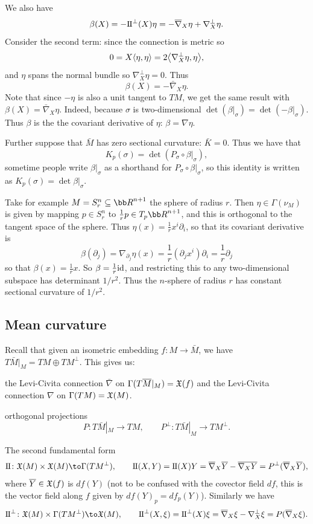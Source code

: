 We also have
$$ \beta(X) = -{\rm I\mkern-1mu\relax I}^\perp(X)\eta = -\overline\nabla_X\eta + \nabla^\perp_X\eta . $$
Consider the second term: since the connection is metric so
$$ 0 = X\mathopen{}\mathclose{\left<\eta,\eta\right>} = 2\mathopen{}\mathclose{\left<\nabla^\perp_X\eta,\eta\right>} , $$
and $\eta$ spans the normal bundle so $\nabla^\perp_X\eta=0$.
Thus
$$ \beta(X) = -\bar\nabla_X\eta . $$
Note that since $-\eta$ is also a unit tangent to $TM$, we get the same result with $\beta(X)=\bar\nabla_X\eta$.
Indeed, because $\sigma$ is two-dimensional $\det(\beta|_\sigma)=\det(-\beta|_\sigma)$.
Thus $\beta$ is the the covariant derivative of $\eta$: $\beta=\nabla\eta$.

Further suppose that $\bar M$ has zero sectional curvature: $\bar K=0$.
Thus we have that
$$ K_p(\sigma) = \det(P_\sigma\circ\beta|_\sigma) , $$
sometime people write $\beta|_\sigma$ as a shorthand for $P_\sigma\circ\beta|_\sigma$, so this identity is written as
$K_p(\sigma)=\det\beta|_\sigma$.

\bexam

    Take for example $M=S^n_r\subseteq\bR^{n+1}$ the sphere of radius $r$.
    Then $\eta\in\Gamma(\nu_M)$ is given by mapping $p\in S^n_r$ to $\frac1rp\in T_p\bR^{n+1}$, and this is orthogonal to the
    tangent space of the sphere.
    Thus $\eta(x)=\frac1rx^i\partial_i$, so that its covariant derivative is
    $$ \beta(\partial_j) = \nabla_{\partial_j}\eta(x) = \frac1r(\partial_jx^i)\partial_i = \frac1r\partial_j $$
    so that $\beta(x)=\frac1rx$.
    So $\beta={{1}\over{r}}{\rm id}$, and restricting this to any two-dimensional subspace has determinant $1/r^2$.
    Thus the $n$-sphere of radius $r$ has constant sectional curvature of $1/r^2$.

\eexam

\subsection{Mean curvature}

Recall that given an isometric embedding $f\colon M\to\bar M$, we have $T\bar M|_M=TM\oplus TM^\perp$.
This gives us:
\benum
    \item the Levi-Civita connection $\bar\nabla$ on $\Gamma(T\overline M|_M)={\frak X}(f)$ and the Levi-Civita connection $\nabla$ on $\Gamma(TM)={\frak X}(M)$.
    \item orthogonal projections
    $$ P\colon T\bar M|_M \to TM,\qquad P^\perp\colon T\bar M|_M \to TM^\perp . $$
    \item The {\emphcolor second fundamental form}
    $$ \sff\colon\X(M)\times\X(M) \to \Gamma(TM^\perp),\qquad \sff(X,Y) = \sff(X)Y = \bar\nabla_X\bar Y - \bar{\nabla_XY} =
    P^\perp(\bar\nabla_X\bar Y) , $$
    where $\overline Y\in{\frak X}(f)$ is $df(Y)$ (not to be confused with the covector field $df$, this is the vector field along $f$ given by
    $df(Y)_p=df_p(Y)$).
    Similarly we have
    $$ \sff^\perp\colon\X(M)\times\Gamma(TM^\perp) \to \X(M),\qquad \sff^\perp(X,\xi) = \sff^\perp(X)\xi = \bar\nabla_X\xi - \nabla^\perp_X\xi
    = P(\bar\nabla_X\xi) . $$
\eenum

